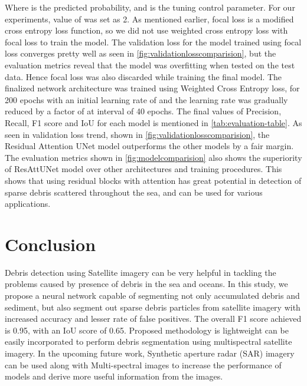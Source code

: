 \documentclass[review]{elsarticle}
\begin{document}
Where  is the predicted probability, and  is the tuning control parameter. For our experiments, value of  was set as 2. As mentioned earlier, focal loss is a modified cross entropy loss function, so we did not use weighted cross entropy loss with focal loss to train the model. The validation loss for the model trained using focal loss converges pretty well as seen in \autoref{fig:validationlosscomparision}, but the evaluation metrics reveal that the model was overfitting when tested on the test data. Hence focal loss was also discarded while training the final model.
The finalized network architecture was trained using Weighted Cross Entropy loss, for 200 epochs with an initial learning rate of  and the learning rate was gradually reduced by a factor of  at interval of 40 epochs. The final values of Precision, Recall, F1 score and IoU for each model is mentioned in \autoref{tab:evaluation-table}.
As seen in validation loss trend, shown in \autoref{fig:validationlosscomparision}, the Residual Attention UNet model outperforms the other models by a fair margin. The evaluation metrics shown in \autoref{fig:modelcomparision} also shows the superiority of ResAttUNet model over other architectures and training procedures. This shows that using residual blocks with attention has great potential in detection of sparse debris scattered throughout the sea, and can be used for various applications.

\section{Conclusion}

Debris detection using Satellite imagery can be very helpful in tackling the problems caused by presence of debris in the sea and oceans. In this study, we propose a neural network capable of segmenting not only accumulated debris and sediment, but also segment out sparse debris particles from satellite imagery with increased accuracy and lesser rate of false positives. The overall F1 score achieved is 0.95, with an IoU score of 0.65. Proposed methodology is lightweight can be easily incorporated to perform debris segmentation using multispectral satellite imagery. In the upcoming future work, Synthetic aperture radar (SAR) imagery can be used along with Multi-spectral images to increase the performance of models and derive more useful information from the images.


\end{document}
